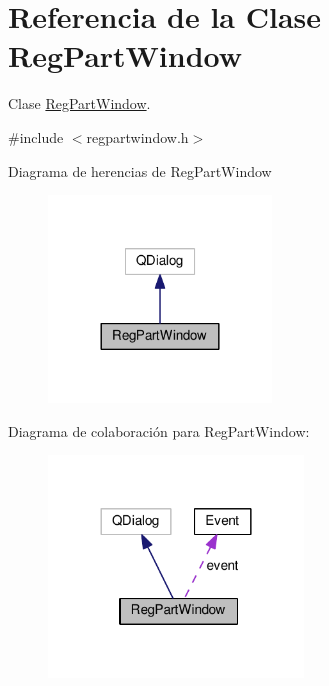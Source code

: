 \hypertarget{class_reg_part_window}{}\section{Referencia de la Clase Reg\+Part\+Window}
\label{class_reg_part_window}


Clase \hyperlink{class_reg_part_window}{Reg\+Part\+Window}.  




{\ttfamily \#include $<$regpartwindow.\+h$>$}



Diagrama de herencias de Reg\+Part\+Window\nopagebreak
\begin{figure}[H]
\begin{center}
\leavevmode
\includegraphics[width=168pt]{class_reg_part_window__inherit__graph}
\end{center}
\end{figure}


Diagrama de colaboración para Reg\+Part\+Window\+:\nopagebreak
\begin{figure}[H]
\begin{center}
\leavevmode
\includegraphics[width=192pt]{class_reg_part_window__coll__graph}
\end{center}
\end{figure}
